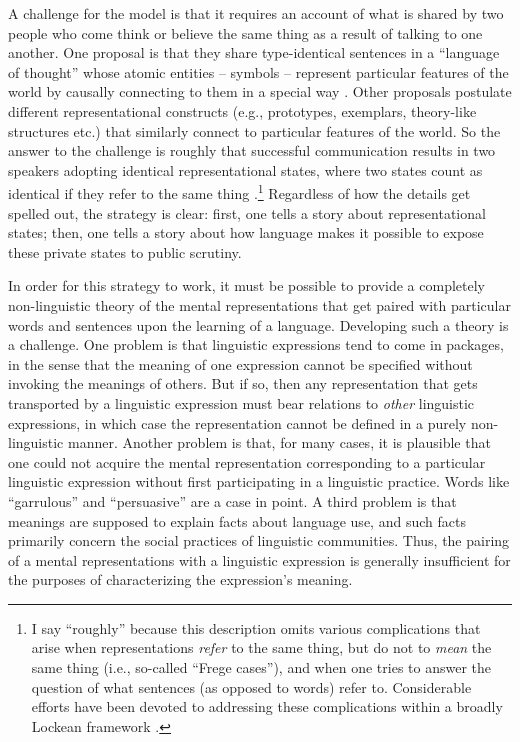 A challenge for the model is that it requires an account of what is shared by two people who come think or believe the same thing as a result of talking to one another. One proposal is that they share type-identical sentences in a ``language of thought'' whose atomic entities -- symbols -- represent particular features of the world by causally connecting to them in a special way \citep{Fodor:1998}. Other proposals postulate different representational constructs (e.g., prototypes, exemplars, theory-like structures etc.) that similarly connect to particular features of the world. So the answer to the challenge is roughly that successful communication results in two speakers adopting identical representational states, where two states count as identical if they refer to the same thing \citep{Fodor:1998,Horwich:2005}.\footnote{I say ``roughly'' because this description omits various complications that arise when representations \textit{refer} to the same thing, but do not to \textit{mean} the same thing (i.e., so-called ``Frege cases''), and when one tries to answer the question of what sentences (as opposed to words) refer to. Considerable efforts have been devoted to addressing these complications within a broadly Lockean framework \citep[see e.g.,][]{Speaks:2014}.} Regardless of how the details get spelled out, the strategy is clear: first, one tells a story about representational states; then, one tells a story about how language makes it possible to expose these private states to public scrutiny. 

In order for this strategy to work, it must be possible to provide a completely non-linguistic theory of the mental representations that get paired with particular words and sentences upon the learning of a language. Developing such a theory is a challenge. One problem is that linguistic expressions tend to come in packages, in the sense that the meaning of one expression cannot be specified without invoking the meanings of others. But if so, then any representation that gets transported by a linguistic expression must bear relations to \textit{other} linguistic expressions, in which case the representation cannot be defined in a purely non-linguistic manner. Another problem is that, for many cases, it is plausible that one could not acquire the mental representation corresponding to a particular linguistic expression without first participating in a linguistic practice. Words like ``garrulous'' and ``persuasive'' are a case in point. A third problem is that meanings are supposed to explain facts about language use, and such facts primarily concern the social practices of linguistic communities. Thus, the pairing of a mental representations with a linguistic expression is generally insufficient for the purposes of characterizing the expression's meaning. 

